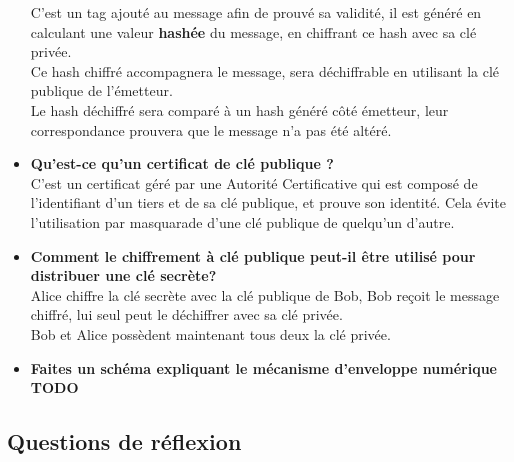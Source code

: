 \documentclass{report}
\begin{document}
\begin{itemize}
					C'est un tag ajouté au message afin de prouvé sa validité, il est généré en calculant une valeur \textbf{hashée} du message, en chiffrant ce hash avec sa clé privée.\\
					Ce hash chiffré accompagnera le message, sera déchiffrable en utilisant la clé publique de l'émetteur.\\
					Le hash déchiffré sera comparé à un hash généré côté émetteur, leur correspondance prouvera que le message n'a pas été altéré.\\

				\item \textbf{Qu'est-ce qu'un certificat de clé publique ?}\\

					C'est un certificat géré par une Autorité Certificative qui est composé de l'identifiant d'un tiers et de sa clé publique, et prouve son identité. Cela évite l'utilisation par masquarade d'une clé publique de quelqu'un d'autre.\\

				\item \textbf{Comment le chiffrement à clé publique peut-il être utilisé pour distribuer une clé secrète?}\\

					Alice chiffre la clé secrète avec la clé publique de Bob, Bob reçoit le message chiffré, lui seul peut le déchiffrer avec sa clé privée.\\
					Bob et Alice possèdent maintenant tous deux la clé privée.\\

				\item \textbf{Faites un schéma expliquant le mécanisme d'enveloppe numérique}\\

					\textbf{TODO}

			\end{itemize}

		\subsection{Questions de réflexion}
\end{document}
